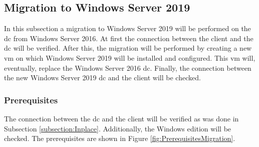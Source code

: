 \subsection{Migration to Windows Server 2019}
In this subsection a migration to Windows Server 2019 will be performed on the \acrshort{dc} from Windows Server 2016. At first the connection between the client and the \acrshort{dc} will be verified. After this, the migration will be performed by creating a new \acrshort{vm} on which Windows Server 2019 will be installed and configured. This \acrshort{vm} will, eventually, replace the Windows Server 2016 \acrshort{dc}. Finally, the connection between the new Windows Server 2019 \acrshort{dc} and the client will be checked.
\subsubsection{Prerequisites}
The connection between the \acrshort{dc} and the client will be verified as was done in Subsection \ref{subsection:Inplace}. Additionally, the Windows edition will be checked. The prerequisites are shown in Figure \ref{fig:PrerequisitesMigration}.

